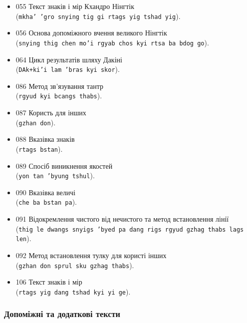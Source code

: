 \documentclass{article}
\begin{document}
\begingroup\raggedright
\begin{itemize}
\item 055 Текст знаків і мір Кхандро Нінгтік \\ (\texttt{mkha' 'gro snying tig gi rtags yig tshad yig}).
\item 056 Основа допоміжного вчення великого Нінгтік \\ (\texttt{snying thig chen mo'i rgyab chos kyi rtsa ba bdog go}).
\item 064 Цикл результатів шляху Дакіні \\ (\texttt{DAk+ki'i lam 'bras kyi skor}).
\item 086 Метод зв’язування тантр \\ (\texttt{rgyud kyi bcangs thabs}).
\item 087 Користь для інших \\ (\texttt{gzhan don}).
\item 088 Вказівка знаків \\ (\texttt{rtags bstan}).
\item 089 Спосіб виникнення якостей \\ (\texttt{yon tan 'byung tshul}).
\item 090 Вказівка величі \\ (\texttt{che ba bstan pa}).
\item 091 Відокремлення чистого від нечистого та метод встановлення лінії \\ (\texttt{thig le dwangs snyigs 'byed pa dang rigs rgyud gzhag thabs lags len}).
\item 092 Метод встановлення тулку для користі інших \\ (\texttt{gzhan don sprul sku gzhag thabs}).
\item 106 Текст знаків і мір \\ (\texttt{rtags yig dang tshad kyi yi ge}).
\end{itemize}
\endgroup

\subsubsection{Допоміжні та додаткові тексти}
\end{document}
